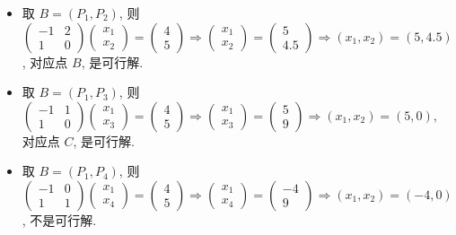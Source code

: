 \documentclass[8pt]{article}
\theoremstyle{compact}
\begin{document}
\begin{itemize}
	\item 取 $B = (P_1, P_2)$, 则 $\begin{pmatrix}-1 & 2 \\ 1 & 0\end{pmatrix} \begin{pmatrix} x_1 \\ x_2 \end{pmatrix} = \begin{pmatrix} 4 \\ 5\end{pmatrix} \Rightarrow \begin{pmatrix} x_1 \\ x_2\end{pmatrix} = \begin{pmatrix} 5 \\ 4.5 \end{pmatrix} \Rightarrow (x_1, x_2) = (5, 4.5)$, 对应点 $B$, 是可行解.
	\item 取 $B = (P_1, P_3)$, 则 $\begin{pmatrix}-1 & 1 \\ 1 & 0\end{pmatrix} \begin{pmatrix} x_1 \\ x_3 \end{pmatrix} = \begin{pmatrix} 4 \\ 5\end{pmatrix} \Rightarrow \begin{pmatrix} x_1 \\ x_3\end{pmatrix} = \begin{pmatrix} 5 \\ 9 \end{pmatrix} \Rightarrow (x_1, x_2) = (5, 0)$, 对应点 $C$, 是可行解.
	\item 取 $B = (P_1, P_4)$, 则 $\begin{pmatrix}-1 & 0 \\ 1 & 1\end{pmatrix} \begin{pmatrix} x_1 \\ x_4 \end{pmatrix} = \begin{pmatrix} 4 \\ 5\end{pmatrix} \Rightarrow \begin{pmatrix} x_1 \\ x_4\end{pmatrix} = \begin{pmatrix} -4 \\ 9 \end{pmatrix} \Rightarrow (x_1, x_2) = (-4, 0)$, 不是可行解.

\end{itemize}
\end{document}
